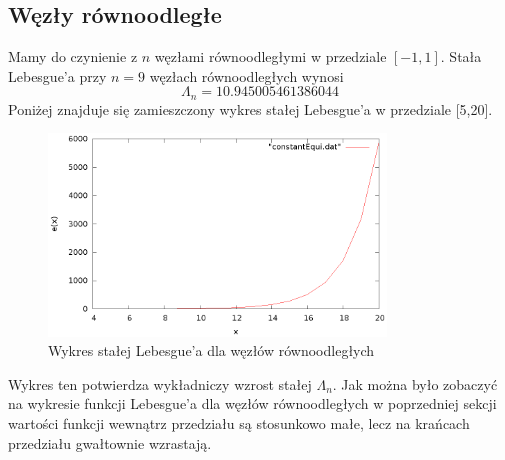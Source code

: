 \documentclass{article}
\begin{document}
\subsection{Węzły równoodległe}
Mamy do czynienie z $n$ węzłami równoodległymi w przedziale $[-1,1]$. Stała Lebesgue'a przy $n = 9$ węzłach równoodległych wynosi
\begin{equation*}
\Lambda_n = 10.945005461386044
\end{equation*}
Poniżej znajduje się zamieszczony wykres stałej Lebesgue'a w przedziale [5,20].
\begin{figure}[H]
    \centering
    \includegraphics[width=0.8\textwidth]{wykresy/constantEqui.eps}
    \caption{Wykres stałej Lebesgue'a dla węzłów równoodległych}
\end{figure}
Wykres ten potwierdza wykładniczy wzrost stałej $\Lambda_n$.
Jak można było zobaczyć na wykresie funkcji Lebesgue'a dla węzłów równoodległych w poprzedniej sekcji wartości funkcji wewnątrz przedziału są stosunkowo małe, lecz na krańcach przedziału gwałtownie wzrastają.
\end{document}
